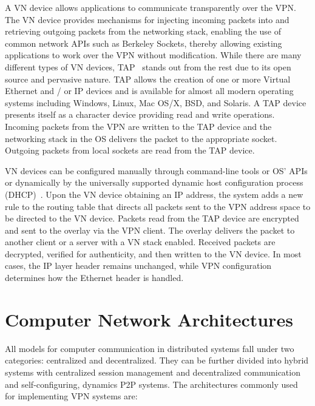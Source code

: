 A VN device allows applications to communicate transparently over the VPN.  The
VN device provides mechanisms for injecting incoming packets into and retrieving
outgoing packets from the networking stack, enabling the use of common network
APIs such as Berkeley Sockets, thereby allowing existing applications to work over
the VPN without modification.  While there are many different types of VN
devices, TAP~\cite{tap} stands out from the rest due to its open source and
pervasive nature.  TAP allows the creation of one or more Virtual Ethernet and
/ or IP devices and is available for almost all modern operating systems
including Windows, Linux, Mac OS/X, BSD, and Solaris.  A TAP device presents
itself as a character device providing read and write operations.  Incoming
packets from the VPN are written to the TAP device and the networking stack in
the OS delivers the packet to the appropriate socket.  Outgoing packets from
local sockets are read from the TAP device.

VN devices can be configured manually through command-line tools or OS' APIs or
dynamically by the universally supported dynamic host configuration process
(DHCP)~\cite{dhcp0, dhcp1}.  Upon the VN device obtaining an IP address, the
system adds a new rule to the routing table that directs all packets sent to
the VPN address space to be directed to the VN device.  Packets read from the
TAP device are encrypted and sent to the overlay via the VPN client.  The
overlay delivers the packet to another client or a server with a VN stack
enabled.  Received packets are decrypted, verified for authenticity, and then
written to the VN device.  In most cases, the IP layer header remains unchanged,
while VPN configuration determines how the Ethernet header is handled.

\section{Computer Network Architectures}
All models for computer communication in distributed systems fall under two
categories:  centralized and decentralized.  They can be further divided into
hybrid systems with centralized session management and decentralized
communication and self-configuring, dynamics P2P systems.  The architectures
commonly used for implementing VPN systems are:

